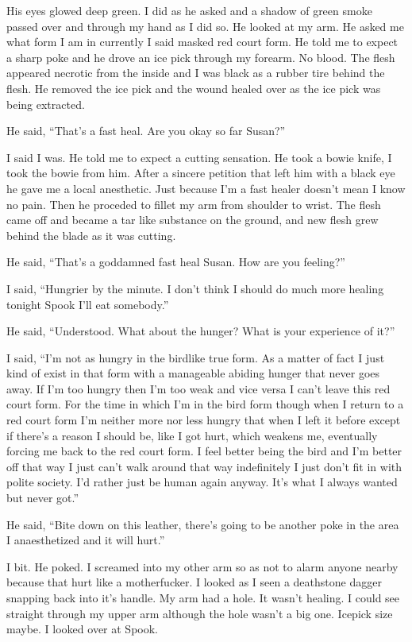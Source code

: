 His eyes glowed deep green. I did as he asked and a shadow of green smoke passed over and through my hand as I did so. He looked at my arm. He asked me what form I am in currently I said masked red court form. He told me to expect a sharp poke and he drove an ice pick through my forearm. No blood. The flesh appeared necrotic from the inside and I was black as a rubber tire behind the flesh. He removed the ice pick and the wound healed over as the ice pick was being extracted.

He said, ``That's a fast heal. Are you okay so far Susan?''

I said I was. He told me to expect a cutting sensation. He took a bowie knife, I took the bowie from him. After a sincere petition that left him with a black eye he gave me a local anesthetic. Just because I'm a fast healer doesn't mean I know no pain. Then he proceded to fillet my arm from shoulder to wrist. The flesh came off and became a tar like substance on the ground, and new flesh grew behind the blade as it was cutting.

He said, ``That's a goddamned fast heal Susan. How are you feeling?''

I said, ``Hungrier by the minute. I don't think I should do much more healing tonight Spook I'll eat somebody.''

He said, ``Understood. What about the hunger? What is your experience of it?''

I said, ``I'm not as hungry in the birdlike true form. As a matter of fact I just kind of exist in that form with a manageable abiding hunger that never goes away. If I'm too hungry then I'm too weak and vice versa I can't leave this red court form. For the time in which I'm in the bird form though when I return to a red court form I'm neither more nor less hungry that when I left it before except if there's a reason I should be, like I got hurt, which weakens me, eventually forcing me back to the red court form. I feel better being the bird and I'm better off that way I just can't walk around that way indefinitely I just don't fit in with polite society. I'd rather just be human again anyway. It's what I always wanted but never got.''

He said, ``Bite down on this leather, there's going to be another poke in the area I anaesthetized and it will hurt.''

I bit. He poked. I screamed into my other arm so as not to alarm anyone nearby because that hurt like a motherfucker. I looked as I seen a deathstone dagger snapping back into it's handle. My arm had a hole. It wasn't healing. I could see straight through my upper arm although the hole wasn't a big one. Icepick size maybe. I looked over at Spook.

